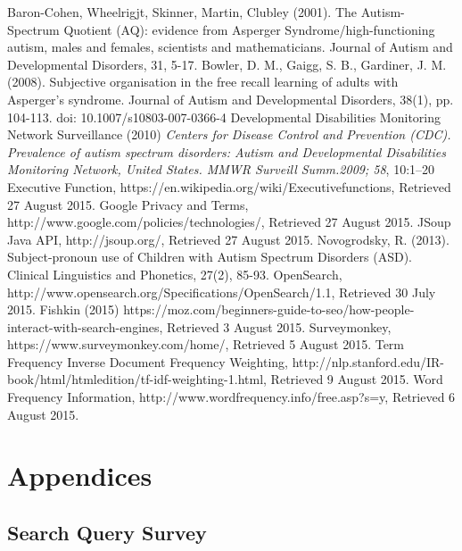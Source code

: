 \documentclass[a4paper, 11pt]{article}
\begin{document}
\clearpage
\begin{thebibliography}{100}
 Baron-Cohen, Wheelrigjt, Skinner, Martin, Clubley (2001).   The Autism-Spectrum Quotient (AQ): evidence from Asperger Syndrome/high-functioning autism, males and females, scientists and mathematicians.  Journal of Autism and Developmental Disorders, 31, 5-17.
 Bowler, D. M., Gaigg, S. B., Gardiner, J. M. (2008). Subjective organisation in the free recall learning of adults with Asperger's syndrome. Journal of Autism and Developmental Disorders, 38(1), pp. 104-113. doi: 10.1007/s10803-007-0366-4 
Developmental Disabilities Monitoring Network Surveillance (2010) \textit{Centers for Disease Control and Prevention (CDC). Prevalence of autism spectrum disorders: Autism and Developmental Disabilities Monitoring Network, United States. MMWR Surveill Summ.2009; 58}, 10:1–20
 Executive Function, https://en.wikipedia.org/wiki/Executivefunctions, Retrieved 27 August 2015.
 Google Privacy and Terms, http://www.google.com/policies/technologies/, Retrieved 27 August 2015.
 JSoup Java API, http://jsoup.org/, Retrieved 27 August 2015.
 Novogrodsky, R. (2013). Subject-pronoun use of Children with Autism Spectrum Disorders (ASD). Clinical Linguistics and Phonetics, 27(2), 85-93. 
OpenSearch, http://www.opensearch.org/Specifications/OpenSearch/1.1, Retrieved 30 July 2015.
 Fishkin (2015) https://moz.com/beginners-guide-to-seo/how-people-interact-with-search-engines, Retrieved 3 August 2015.
Surveymonkey, https://www.surveymonkey.com/home/, Retrieved 5 August 2015.
 Term Frequency Inverse Document Frequency Weighting, http://nlp.stanford.edu/IR-book/html/htmledition/tf-idf-weighting-1.html, Retrieved 9 August 2015.
 Word Frequency Information, http://www.wordfrequency.info/free.asp?s=y, Retrieved 6 August 2015.
\end{thebibliography}





\newpage
\section {Appendices}

\newpage
\subsection{Search Query Survey} \label{AppendixA}
\end{document}
